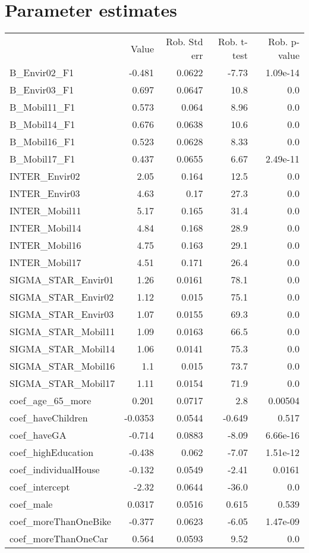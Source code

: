 \section{Parameter estimates}
\begin{tabular}{lrrrr}
{} & {Value} & {Rob. Std err} & {Rob. t-test} & {Rob. p-value} \\
B_Envir02_F1 & -0.481 & 0.0622 & -7.73 & 1.09e-14 \\
B_Envir03_F1 & 0.697 & 0.0647 & 10.8 & 0.0 \\
B_Mobil11_F1 & 0.573 & 0.064 & 8.96 & 0.0 \\
B_Mobil14_F1 & 0.676 & 0.0638 & 10.6 & 0.0 \\
B_Mobil16_F1 & 0.523 & 0.0628 & 8.33 & 0.0 \\
B_Mobil17_F1 & 0.437 & 0.0655 & 6.67 & 2.49e-11 \\
INTER_Envir02 & 2.05 & 0.164 & 12.5 & 0.0 \\
INTER_Envir03 & 4.63 & 0.17 & 27.3 & 0.0 \\
INTER_Mobil11 & 5.17 & 0.165 & 31.4 & 0.0 \\
INTER_Mobil14 & 4.84 & 0.168 & 28.9 & 0.0 \\
INTER_Mobil16 & 4.75 & 0.163 & 29.1 & 0.0 \\
INTER_Mobil17 & 4.51 & 0.171 & 26.4 & 0.0 \\
SIGMA_STAR_Envir01 & 1.26 & 0.0161 & 78.1 & 0.0 \\
SIGMA_STAR_Envir02 & 1.12 & 0.015 & 75.1 & 0.0 \\
SIGMA_STAR_Envir03 & 1.07 & 0.0155 & 69.3 & 0.0 \\
SIGMA_STAR_Mobil11 & 1.09 & 0.0163 & 66.5 & 0.0 \\
SIGMA_STAR_Mobil14 & 1.06 & 0.0141 & 75.3 & 0.0 \\
SIGMA_STAR_Mobil16 & 1.1 & 0.015 & 73.7 & 0.0 \\
SIGMA_STAR_Mobil17 & 1.11 & 0.0154 & 71.9 & 0.0 \\
coef_age_65_more & 0.201 & 0.0717 & 2.8 & 0.00504 \\
coef_haveChildren & -0.0353 & 0.0544 & -0.649 & 0.517 \\
coef_haveGA & -0.714 & 0.0883 & -8.09 & 6.66e-16 \\
coef_highEducation & -0.438 & 0.062 & -7.07 & 1.51e-12 \\
coef_individualHouse & -0.132 & 0.0549 & -2.41 & 0.0161 \\
coef_intercept & -2.32 & 0.0644 & -36.0 & 0.0 \\
coef_male & 0.0317 & 0.0516 & 0.615 & 0.539 \\
coef_moreThanOneBike & -0.377 & 0.0623 & -6.05 & 1.47e-09 \\
coef_moreThanOneCar & 0.564 & 0.0593 & 9.52 & 0.0 \\
\end{tabular}

